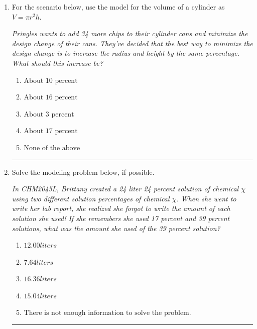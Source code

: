 \documentclass[14pt]{extbook}
\newcommand{\litem}[1]{\item#1\hspace*{-1cm}\rule{\textwidth}{0.4pt}}
\begin{document}
\begin{enumerate}
{\begin{enumerate}[label=\Alph*.]
\end{enumerate} }
\litem{
For the scenario below, use the model for the volume of a cylinder as $V = \pi r^2 h$.
\begin{center}
    \textit{ Pringles wants to add 34 \text{percent} more chips to their cylinder cans and minimize the design change of their cans. They've decided that the best way to minimize the design change is to increase the radius and height by the same percentage. What should this increase be? }
\end{center}
\begin{enumerate}[label=\Alph*.]
\item \( \text{About } 10 \text{ percent} \)
\item \( \text{About } 16 \text{ percent} \)
\item \( \text{About } 3 \text{ percent} \)
\item \( \text{About } 17 \text{ percent} \)
\item \( \text{None of the above} \)

\end{enumerate} }
\litem{
Solve the modeling problem below, if possible.
\begin{center}
    \textit{ In CHM2045L, Brittany created a 24 liter 24 percent solution of chemical $\chi$ using two different solution percentages of chemical $\chi$. When she went to write her lab report, she realized she forgot to write the amount of each solution she used! If she remembers she used 17 percent and 39 percent solutions, what was the amount she used of the 39 percent solution? }
\end{center}
\begin{enumerate}[label=\Alph*.]
\item \( 12.00 liters \)
\item \( 7.64 liters \)
\item \( 16.36 liters \)
\item \( 15.04 liters \)
\item \( \text{There is not enough information to solve the problem.} \)


\end{enumerate}}
\end{enumerate}
\end{document}
